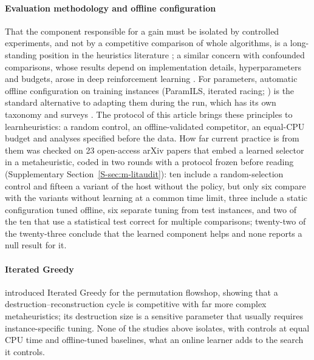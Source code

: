 \paragraph{Evaluation methodology and offline configuration}
That the component responsible for a gain must be isolated by controlled experiments, and not by a competitive comparison of whole algorithms, is a long-standing position in the heuristics literature
\citep{Hooker1995,BarrEtal1995}; a similar concern with confounded comparisons, whose results depend on implementation details, hyperparameters
and budgets, arose in deep reinforcement learning \citep{Henderson2018}. For parameters, automatic offline configuration on training instances (ParamILS, iterated racing;
\citealp{HutterEtal2009,LopezIbanezEtal2016}) is the standard alternative to adapting them during the run, which has its own taxonomy and surveys \citep{EibenEtal1999,KarafotiasEtal2015,AletiMoser2016}. The protocol of this article
brings these principles to learnheuristics: a random control, an offline-validated competitor, an equal-CPU budget and analyses specified before the data. How far current practice is from them was checked on 23 open-access arXiv papers that embed a learned selector in a metaheuristic, coded in two rounds with a protocol frozen before reading
(Supplementary Section~\ref{S-sec:m-litaudit}): ten include a random-selection control and fifteen a variant of the host without the policy, but only six compare with the variants without learning at a common time limit, three include a static configuration tuned offline, six separate tuning from test instances, and two of the ten that use a statistical test correct for multiple comparisons; twenty-two of the twenty-three conclude that the learned component helps and none reports a null result for it. 

\paragraph{Iterated Greedy}
\citet{RuizStutzle2007} introduced Iterated Greedy for the permutation flowshop, showing that a destruction--reconstruction cycle is competitive with far more complex metaheuristics; its
destruction size is a sensitive parameter that usually requires instance-specific tuning. None of the studies above isolates, with controls at equal CPU time and offline-tuned baselines, what an
online learner adds to the search it controls.
